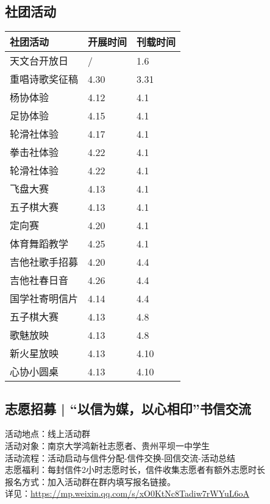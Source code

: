 \documentclass[letterpaper, 12pt]{article}
\begin{document}
\begin{multicols}{2}
\section{社团活动}
\begin{tabular}{|>{\centering\arraybackslash}m{}|m{}|m{}|}
    \hline
    社团活动 & 开展时间 & 刊载时间\\
    \hline\hline
    天文台开放日 & / & 1.6\\
    重唱诗歌奖征稿 & 4.30 & 3.31\\
    杨协体验 & 4.12 & 4.1\\
    足协体验 & 4.15 & 4.1\\
    轮滑社体验 & 4.17 & 4.1\\
    拳击社体验 & 4.22 & 4.1\\
    轮滑社体验 & 4.22 & 4.1\\
    飞盘大赛 & 4.13 & 4.1\\
    五子棋大赛 & 4.13 & 4.1\\
    定向赛 & 4.20 & 4.1\\
    体育舞蹈教学 & 4.25 & 4.1\\
    吉他社歌手招募 & 4.20 & 4.4\\
    吉他社春日音 & 4.26 & 4.4\\
    国学社寄明信片 & 4.14 & 4.4\\
    五子棋大赛 & 4.13 & 4.8\\
    歌魅放映 & 4.13 & 4.8\\
    新火星放映 & 4.13 & 4.10\\
    心协小圆桌 & 4.13 & 4.10\\
    \hline
\end{tabular}

\subsection{志愿招募 | “以信为媒，以心相印”书信交流}
活动地点：线上活动群
\\活动对象：南京大学鸿新社志愿者、贵州平坝一中学生
\\活动流程：活动启动与信件分配-信件交换-回信交流-活动总结
\\志愿福利：每封信件2小时志愿时长，信件收集志愿者有额外志愿时长
\\报名方式：加入活动群在群内填写报名链接。
\\详见：\url{https://mp.weixin.qq.com/s/xO0KtNc8Tadiw7rWYuL6oA}


\end{multicols}
\end{document}
